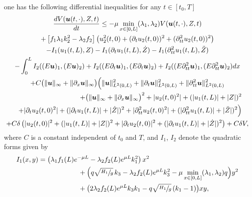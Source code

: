 {\begin{prop}
one has the following differential inequalities for any $t\in[t_{0},T]$
\begin{multline}
\label{dVtot}
\frac{dV(\boldsymbol{u}(t,\cdot),Z,t)}{dt}\leq-\mu\min\limits_{x\in[0,L]}(\lambda_{1},\lambda_{2})V(\boldsymbol{u}(t,\cdot),Z,t)\\
+\left[f_{1}\lambda_{1}k_{2}^{2}-\lambda_{2}f_{2}\right]\left(u_{2}^{2}(t,0)+(\partial_{t}u_{2}(t,0))^{2}+(\partial_{tt}^{2}u_{2}(t,0))^{2}\right)\\
-I_{1}(u_{1}(t,L),Z)-I_{1}(\partial_{t}u_{1}(t,L),\dot Z)-I_{1}(\partial_{tt}^{2}u_{1}(t,L),\ddot Z)\\
-\int_{0}^{L}I_{2}((E\boldsymbol{u})_{1},(E\boldsymbol{u})_{2})+I_{2}((E\partial_{t}\boldsymbol{u})_{1},(E\partial_{t}\boldsymbol{u})_{2})+I_{2}((E\partial_{tt}^{2}\boldsymbol{u})_{1},(E\partial_{tt}^{2}\boldsymbol{u})_{2})dx\\
+C\bigl(\lVert \boldsymbol{u}\rVert_{\infty}+\lVert \partial_{x} \boldsymbol{u}\rVert_{\infty} \bigr) \Bigl(\lVert\boldsymbol{u} \rVert_{L^{2}(0,L)}^{2}+\lVert\partial_{t}\boldsymbol{u} \rVert_{L^{2}(0,L)}^{2}
+\lVert\partial_{tt}^{2}\boldsymbol{u} \rVert_{L^{2}(0,L)}^{2}\\
\shoveright{+\bigl(\lVert \boldsymbol{u}\rVert_{\infty}+\lVert \partial_{x} \boldsymbol{u}\rVert_{\infty}\bigr)^{{2}}
+|u_{2}(t,0)^{2}|+(|u_{1}(t,L)|+|Z|)^{2}}\\
\shoveright{+|\partial_{t}u_{2}(t,0)^{2}|+(|\partial_{t}u_{1}(t,L)|+|\dot Z|)^{2}
+|\partial_{tt}^{2}u_{2}(t,0)^{2}|
+(|\partial_{tt}^{2}u_{1}(t,L)|+|\ddot Z|)^{2}\Bigr)}\\
+C\delta\left(|u_{2}(t,0)|^{2}+(|u_{1}(t,L)|+|Z|)^{2}+|\partial_{t}u_{2}(t,0)|^{2}+(|\partial_{t}u_{1}(t,L)|+|\dot Z|)^{2}\right)+C\delta V,
\end{multline}
where $C$ is a constant independent of $t_{0}$ and $T$, and $I_{1}$, $I_{2}$ denote the quadratic forms given by
\begin{equation*}
\begin{split}
I_{1}(x,y)&=\left(\lambda_{1}f_{1}(L)e^{-\mu L}-\lambda_{2}f_{2}(L)e^{\mu L}k_{1}^{2}\right)x^{2}\\
&\hspace*{2.06cm}+{\Bigl(q\sqrt{\sfrac{H_{1}}{g}}\,k_{3}-\lambda_{2}f_{2}(L)e^{\mu L}k_{3}^{2}-\mu\min\limits_{x\in[0,L]}(\lambda_{1},\lambda_{2})q \Bigr)}y^{2}\\
&\hspace*{2.06cm}+\bigl(2\lambda_{2}f_{2}(L)e^{\mu L}k_{3}k_{1}-{q\sqrt{\sfrac{H_{1}}{g}}}\,(k_{1}-1)\bigr)xy,\\

\end{split}
\end{equation*}
\end{prop}}
